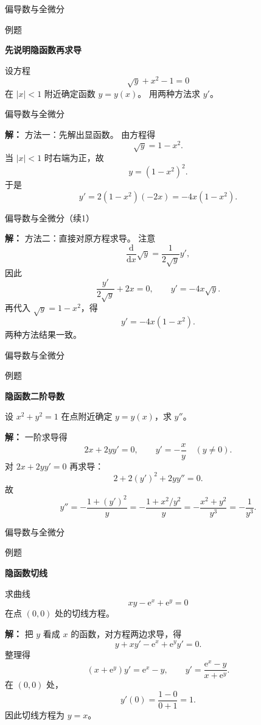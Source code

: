 \documentclass[aspectratio=169,10pt,fontset=fandol]{ctexbeamer}
\newcommand{\dd}{\mathrm{d}}
\newcommand{\ee}{\mathrm{e}}
\begin{document}
\begin{frame}[t,fragile]{偏导数与全微分}
\normalsize
\begin{block}{例题}
{\normalsize
\textbf{先说明隐函数再求导}\par

	设方程
	\[
	\sqrt{y}+x^2-1=0
	\]
	在 $|x|<1$ 附近确定函数 $y=y(x)$。 用两种方法求 $y'$。

}
\end{block}
\end{frame}
\begin{frame}[t,fragile]{偏导数与全微分}
\normalsize
{\normalsize
\textbf{解：}
方法一：先解出显函数。 由方程得
	\[
	\sqrt{y}=1-x^2.
	\]
	当 $|x|<1$ 时右端为正，故
	\[
	y=(1-x^2)^2.
	\]
	于是
	\[
	y'=2(1-x^2)(-2x)=-4x(1-x^2).
	\]
	

}
\end{frame}
\begin{frame}[t,fragile]{偏导数与全微分（续1）}
\normalsize
{\normalsize
\textbf{解：}
	方法二：直接对原方程求导。 注意
	\[
	\frac{\dd}{\dd x}\sqrt{y}
	=\frac{1}{2\sqrt{y}}y',
	\]
	因此
	\[
	\frac{y'}{2\sqrt{y}}+2x=0,
	\qquad
	y'=-4x\sqrt{y}.
	\]
	再代入 $\sqrt{y}=1-x^2$，得
	\[
	y'=-4x(1-x^2).
	\]
	两种方法结果一致。

}
\end{frame}
\begin{frame}[t,fragile]{偏导数与全微分}
\normalsize
\begin{block}{例题}
{\normalsize
\textbf{隐函数二阶导数}\par

	设 $x^2+y^2=1$ 在点附近确定 $y=y(x)$，求 $y''$。

}
\end{block}
\pause
{\normalsize
\textbf{解：}
一阶求导得
	\[
	2x+2yy'=0,\qquad y'=-\frac{x}{y}\quad(y\neq0).
	\]
	对 $2x+2yy'=0$ 再求导：
	\[
	2+2(y')^2+2yy''=0.
	\]
	故
	\[
	y''=-\frac{1+(y')^2}{y}=-\frac{1+x^2/y^2}{y}
	=-\frac{x^2+y^2}{y^3}=-\frac1{y^3}.
	\]

}
\end{frame}
\begin{frame}[t,fragile]{偏导数与全微分}
\small
\begin{block}{例题}
{\small
\textbf{隐函数切线}\par

	求曲线
	\[
	xy-\ee^x+\ee^y=0
	\]
	在点 $(0,0)$ 处的切线方程。

}
\end{block}
\pause
{\small
\textbf{解：}
把 $y$ 看成 $x$ 的函数，对方程两边求导，得
	\[
	y+xy'-\ee^x+\ee^y y'=0.
	\]
	整理得
	\[
	(x+\ee^y)y'=\ee^x-y,\qquad
	y'=\frac{\ee^x-y}{x+\ee^y}.
	\]
	在 $(0,0)$ 处，
	\[
	y'(0)=\frac{1-0}{0+1}=1.
	\]
	因此切线方程为 $y=x$。

}
\end{frame}
\end{document}
